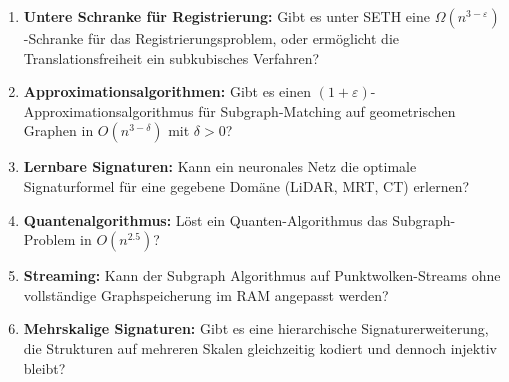 ﻿\documentclass[a4paper,12pt]{article}
\theoremstyle{definition}
\begin{document}
\begin{enumerate}
  \item \textbf{Untere Schranke für Registrierung:} Gibt es unter
        SETH eine $\Omega(n^{3-\varepsilon})$-Schranke für das
        Registrierungsproblem, oder ermöglicht die Translationsfreiheit
        ein subkubisches Verfahren?
  \item \textbf{Approximationsalgorithmen:} Gibt es einen
        $(1+\varepsilon)$-Approximationsalgorithmus für Subgraph-Matching
        auf geometrischen Graphen in $O(n^{3-\delta})$ mit $\delta > 0$?
  \item \textbf{Lernbare Signaturen:} Kann ein neuronales Netz die
        optimale Signaturformel für eine gegebene Domäne
        (LiDAR, MRT, CT) erlernen?
  \item \textbf{Quantenalgorithmus:} Löst ein Quanten-Algorithmus
        das Subgraph-Problem in $O(n^{2.5})$?
  \item \textbf{Streaming:} Kann der Subgraph Algorithmus auf
        Punktwolken-Streams ohne vollständige Graphspeicherung
        im RAM angepasst werden?
  \item \textbf{Mehrskalige Signaturen:} Gibt es eine hierarchische
        Signaturerweiterung, die Strukturen auf mehreren Skalen
        gleichzeitig kodiert und dennoch injektiv bleibt?
\end{enumerate}
\end{document}
